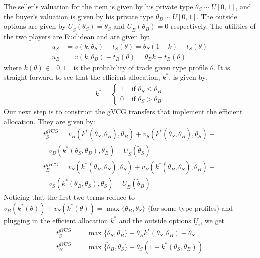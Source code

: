 \documentclass[a4paper]{article}
\begin{document}
The seller's valuation for the item is given by his private type $\theta_S \sim U[0,1]$, and the buyer's valuation is given by his private type $\theta_B \sim U[0,1]$. The outside options are given by $\underline{U}_S({\theta}_S)={\theta}_S$ and $\underline{U}_B({\theta}_B)=0$ respectively. The utilities of the two players are Euclidean and are given by:
\begin{align*}
	u_S &= v(k,\theta_S)-t_S(\theta)=\theta_S (1-k)-t_S(\theta)
	\\
	u_B &= v(k,\theta_B)-t_B(\theta)=\theta_B k-t_B(\theta)
\end{align*}
where $k(\theta) \in [0,1]$ is the probability of trade given type profile $\theta$. It is straight-forward to see that the efficient allocation, $k^*$, is given by:
\begin{align*}
	k^*= \begin{cases}
		1 & \text{ if } \theta_S \leq \theta_B \\ 
		0 & \text{ if } \theta_S > \theta_B
	\end{cases}
\end{align*}
Our next step is to construct the gVCG transfers that implement the efficient allocation. They are given by:
\begin{align*}
	t_S^{gVCG} = v_B(k^*(\tilde{\theta}_S,\theta_B),\theta_B) + v_S(k^*(\tilde{\theta}_S,\theta_B),\tilde{\theta}_S) - \\
	-v_B(k^*(\theta_S,\theta_B),\theta_B) - \underline{U}_S(\tilde{\theta}_S)
	\\
	t_B^{gVCG} = v_S(k^*(\tilde{\theta}_B,\theta_S),\theta_S) + v_B(k^*(\tilde{\theta}_B,\theta_S),\tilde{\theta}_B) - \\
	-v_S(k^*(\theta_B,\theta_S),\theta_S) - \underline{U}_B(\tilde{\theta}_B)
\end{align*}
Noticing that the first two terms reduce to $v_B(k^*(\theta))+v_S(k^*(\theta)) = \max \{\theta_B,\theta_S\}$ (for some type profiles) and plugging in the efficient allocation $k^*$ and the outside options $\underline{U}_i$, we get
\begin{align*}
	t_S^{gVCG} &= \max\{\tilde{\theta}_S,\theta_B\} - \theta_B k^*(\theta_S,\theta_B) - \tilde{\theta}_S
	\\
	t_B^{gVCG} &= \max\{\tilde{\theta}_B,\theta_S\} - \theta_S \left(1 - k^*(\theta_S,\theta_B)\right)
\end{align*}
\end{document}
